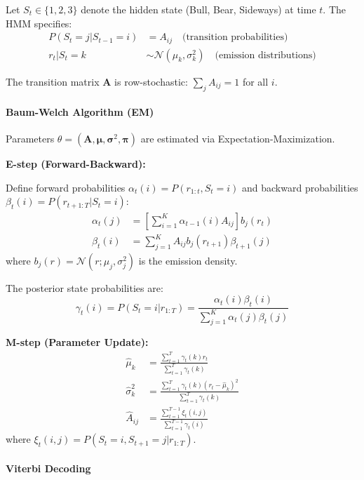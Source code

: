 Let $S_t \in \{1, 2, 3\}$ denote the hidden state (Bull, Bear, Sideways) at time $t$. The HMM specifies:
\begin{align}
  P(S_t = j | S_{t-1} = i) &= A_{ij} \quad \text{(transition probabilities)} \\
  r_t | S_t = k &\sim \mathcal{N}(\mu_k, \sigma_k^2) \quad \text{(emission distributions)}
\end{align}

The transition matrix $\mathbf{A}$ is row-stochastic: $\sum_j A_{ij} = 1$ for all $i$.

\paragraph{Baum-Welch Algorithm (EM)}

Parameters $\theta = (\mathbf{A}, \boldsymbol{\mu}, \boldsymbol{\sigma}^2, \boldsymbol{\pi})$ are estimated via Expectation-Maximization.

\textbf{E-step (Forward-Backward):}

Define forward probabilities $\alpha_t(i) = P(r_{1:t}, S_t = i)$ and backward probabilities $\beta_t(i) = P(r_{t+1:T} | S_t = i)$:
\begin{align}
  \alpha_t(j) &= \left[ \sum_{i=1}^{K} \alpha_{t-1}(i) A_{ij} \right] b_j(r_t) \\
  \beta_t(i) &= \sum_{j=1}^{K} A_{ij} b_j(r_{t+1}) \beta_{t+1}(j)
\end{align}
where $b_j(r) = \mathcal{N}(r; \mu_j, \sigma_j^2)$ is the emission density.

The posterior state probabilities are:
\begin{equation}
  \gamma_t(i) = P(S_t = i | r_{1:T}) = \frac{\alpha_t(i) \beta_t(i)}{\sum_{j=1}^{K} \alpha_t(j) \beta_t(j)}
\end{equation}

\textbf{M-step (Parameter Update):}
\begin{align}
  \hat{\mu}_k &= \frac{\sum_{t=1}^{T} \gamma_t(k) r_t}{\sum_{t=1}^{T} \gamma_t(k)} \\
  \hat{\sigma}_k^2 &= \frac{\sum_{t=1}^{T} \gamma_t(k) (r_t - \hat{\mu}_k)^2}{\sum_{t=1}^{T} \gamma_t(k)} \\
  \hat{A}_{ij} &= \frac{\sum_{t=1}^{T-1} \xi_t(i, j)}{\sum_{t=1}^{T-1} \gamma_t(i)}
\end{align}
where $\xi_t(i, j) = P(S_t = i, S_{t+1} = j | r_{1:T})$.

\paragraph{Viterbi Decoding}

